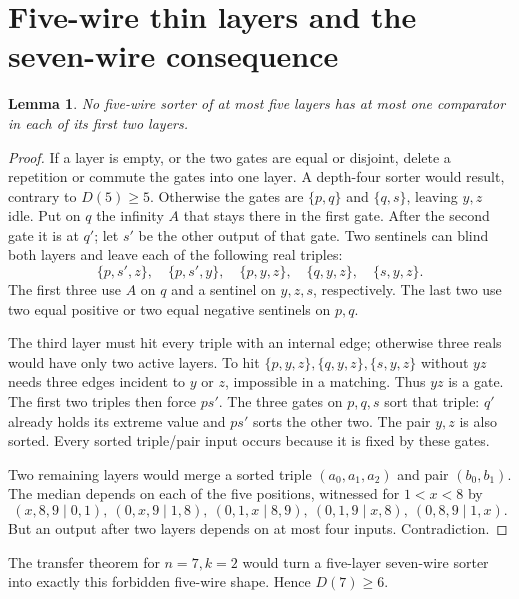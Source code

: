 \documentclass[11pt]{article}
\newtheorem{lemma}[theorem]{Lemma}
\begin{document}
\section{Five-wire thin layers and the seven-wire consequence}\label{app:five}
\begin{lemma}\label{lem:five}
No five-wire sorter of at most five layers has at most one comparator in each of its first two layers.
\end{lemma}
\begin{proof}
If a layer is empty, or the two gates are equal or disjoint, delete a repetition or commute the gates into one layer. A depth-four sorter would result, contrary to $D(5)\ge5$. Otherwise the gates are $\{p,q\}$ and $\{q,s\}$, leaving $y,z$ idle. Put on $q$ the infinity $A$ that stays there in the first gate. After the second gate it is at $q'$; let $s'$ be the other output of that gate. Two sentinels can blind both layers and leave each of the following real triples:
\[
\{p,s',z\},\quad\{p,s',y\},\quad\{p,y,z\},\quad
\{q,y,z\},\quad\{s,y,z\}.
\]
The first three use $A$ on $q$ and a sentinel on $y,z,s$, respectively. The last two use two equal positive or two equal negative sentinels on $p,q$.

The third layer must hit every triple with an internal edge; otherwise three reals would have only two active layers. To hit $\{p,y,z\},\{q,y,z\},\{s,y,z\}$ without $yz$ needs three edges incident to $y$ or $z$, impossible in a matching. Thus $yz$ is a gate. The first two triples then force $ps'$. The three gates on $p,q,s$ sort that triple: $q'$ already holds its extreme value and $ps'$ sorts the other two. The pair $y,z$ is also sorted. Every sorted triple/pair input occurs because it is fixed by these gates.

Two remaining layers would merge a sorted triple $(a_0,a_1,a_2)$ and pair $(b_0,b_1)$. The median depends on each of the five positions, witnessed for $1<x<8$ by
\[
(x,8,9\mid0,1),\ (0,x,9\mid1,8),\ (0,1,x\mid8,9),\
(0,1,9\mid x,8),\ (0,8,9\mid1,x).
\]
But an output after two layers depends on at most four inputs. Contradiction.
\end{proof}
The transfer theorem for $n=7,k=2$ would turn a five-layer seven-wire sorter into exactly this forbidden five-wire shape. Hence $D(7)\ge6$.
\end{document}
